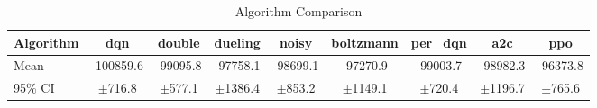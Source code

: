 \begin{table}[htbp]
\centering
\caption{Algorithm Comparison}
\label{tab:algorithm_comparison}
\begin{tabular}{lcccccccc}
\toprule
Algorithm & dqn & double & dueling & noisy & boltzmann & per_dqn & a2c & ppo \\
\midrule
Mean  & -100859.6 & -99095.8 & -97758.1 & -98699.1 & -97270.9 & -99003.7 & -98982.3 & -96373.8 \\
95\% CI  & $\pm$716.8 & $\pm$577.1 & $\pm$1386.4 & $\pm$853.2 & $\pm$1149.1 & $\pm$720.4 & $\pm$1196.7 & $\pm$765.6 \\
\bottomrule
\end{tabular}
\end{table}